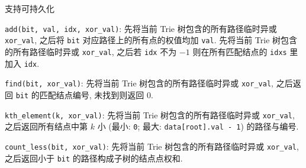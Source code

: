 支持可持久化

\verb|add(bit, val, idx, xor_val)|: 先将当前 Trie 树包含的所有路径临时异或 \verb|xor_val|, 之后将 \verb|bit| 对应路径上的所有点的权值均加 \verb|val|. 先将当前 Trie 树包含的所有路径临时异或 \verb|xor_val|, 之后若 \verb|idx| 不为 \(-1\) 则在所有匹配结点的 \verb|idxs| 里加入 \verb|idx|.

\verb|find(bit, xor_val)|: 先将当前 Trie 树包含的所有路径临时异或 \verb|xor_val|, 之后返回 \verb|bit| 的匹配结点编号, 未找到则返回 \(0\).

\verb|kth_element(k, xor_val)|: 先将当前 Trie 树包含的所有路径临时异或 \verb|xor_val|, 之后返回所有结点中第 \(k\) 小 (最小: \verb|0|; 最大: \verb|data[root].val - 1|) 的路径与编号.

\verb|count_less(bit, xor_val)|: 先将当前 Trie 树包含的所有路径临时异或 \verb|xor_val|, 之后返回小于 \verb|bit| 的路径构成子树的结点点权和.
